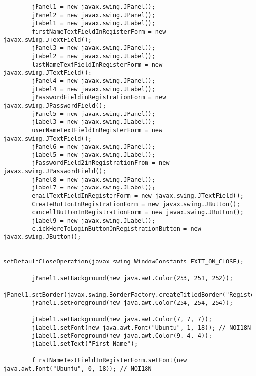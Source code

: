 \documentclass[12pt,a4paper]{article}
\begin{document}
\begin{lstlisting}
        jPanel1 = new javax.swing.JPanel();
        jPanel2 = new javax.swing.JPanel();
        jLabel1 = new javax.swing.JLabel();
        firstNameTextFieldInRegisterForm = new javax.swing.JTextField();
        jPanel3 = new javax.swing.JPanel();
        jLabel2 = new javax.swing.JLabel();
        lastNameTextFieldInRegisterForm = new javax.swing.JTextField();
        jPanel4 = new javax.swing.JPanel();
        jLabel4 = new javax.swing.JLabel();
        jPasswordFieldinRegistrationForm = new javax.swing.JPasswordField();
        jPanel5 = new javax.swing.JPanel();
        jLabel3 = new javax.swing.JLabel();
        userNameTextFieldInRegisterForm = new javax.swing.JTextField();
        jPanel6 = new javax.swing.JPanel();
        jLabel5 = new javax.swing.JLabel();
        jPasswordField2inRegistrationFrom = new javax.swing.JPasswordField();
        jPanel8 = new javax.swing.JPanel();
        jLabel7 = new javax.swing.JLabel();
        emailTextFieldInRegisterForm = new javax.swing.JTextField();
        CreateButtonInRegistrationForm = new javax.swing.JButton();
        cancellButtonInRegistrationForm = new javax.swing.JButton();
        jLabel9 = new javax.swing.JLabel();
        clickHereToLoginButtonOnRegistrationButton = new javax.swing.JButton();

        setDefaultCloseOperation(javax.swing.WindowConstants.EXIT_ON_CLOSE);

        jPanel1.setBackground(new java.awt.Color(253, 251, 252));
        jPanel1.setBorder(javax.swing.BorderFactory.createTitledBorder("Register"));
        jPanel1.setForeground(new java.awt.Color(254, 254, 254));

        jLabel1.setBackground(new java.awt.Color(7, 7, 7));
        jLabel1.setFont(new java.awt.Font("Ubuntu", 1, 18)); // NOI18N
        jLabel1.setForeground(new java.awt.Color(9, 4, 4));
        jLabel1.setText("First Name");

        firstNameTextFieldInRegisterForm.setFont(new java.awt.Font("Ubuntu", 0, 18)); // NOI18N


\end{lstlisting}
\end{document}
